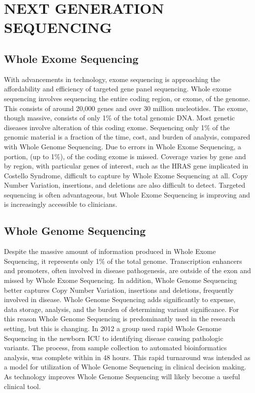 \documentclass[sigconf]{acmart}
\begin{document}
\section{NEXT GENERATION SEQUENCING}

\subsection{Whole Exome Sequencing}
With advancements in technology, exome sequencing is approaching the affordability and efficiency of targeted gene panel sequencing.  Whole exome sequencing involves sequencing the entire coding region, or exome, of the genome.  This consists of around 20,000 genes and over 30 million nucleotides.  The exome, though massive, consists of only 1\% of the total genomic DNA.  Most genetic diseases involve alteration of this coding exome.  Sequencing only 1\% of the genomic material is a fraction of the time, cost, and burden of analysis, compared with Whole Genome Sequencing. Due to errors in Whole Exome Sequencing, a portion, (up to 1\%), of the coding exome is missed.   Coverage varies by gene and by region, with particular genes of interest, such as the HRAS gene implicated in Costello Syndrome, difficult to capture by Whole Exome Sequencing at all. Copy Number Variation, insertions, and deletions are also difficult to detect. Targeted sequencing is often advantageous, but Whole Exome Sequencing is improving and is increasingly accessible to clinicians.  

\subsection{Whole Genome Sequencing}
Despite the massive amount of information produced in Whole Exome Sequencing, it represents only 1\% of the total genome.  Transcription enhancers and promoters, often involved in disease pathogenesis, are outside of the exon and missed by Whole Exome Sequencing.   In addition, Whole Genome Sequencing better captures Copy Number Variation, insertions and deletions, frequently involved in disease. Whole Genome Sequencing adds significantly to expense, data storage, analysis, and the burden of determining variant significance.  For this reason Whole Genome Sequencing is predominantly used in the research setting, but this is changing.  In 2012 a group used rapid Whole Genome Sequencing in the newborn ICU to identifying disease causing pathologic variants.  The process, from sample collection to automated bioinformatics analysis, was complete within in 48 hours.  This rapid turnaround was intended as a model for utilization of Whole Genome Sequencing in clinical decision making.  As technology improves Whole Genome Sequencing will likely become a useful clinical tool. 
\end{document}
